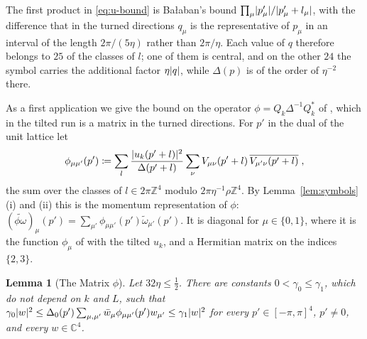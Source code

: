 \documentclass[11pt]{preprint}
\DeclarePairedDelimiter{\abs}{\lvert}{\rvert}
\numberwithin{equation}{section}
\newtheorem{lemma}[theorem]{Lemma}
\theoremstyle{definition}
\theoremstyle{remark}
\theoremstyle{plain}
\begin{document}
The first product in \eqref{eq:u-bound} is Ba{\l}aban's bound $\prod_\mu\abs{p'_\mu}/\abs{p'_\mu + l_\mu}$, with the difference that in the turned directions $q_\mu$ is the representative of $p_\mu$ in an interval of the length $2\pi/(5\eta)$ rather than $2\pi/\eta$. Each value of $q$ therefore belongs to $25$ of the classes of $l$; one of them is central, and on the other $24$ the symbol carries the additional factor $\eta\abs{q}$, while $\Delta(p)$ is of the order of $\eta^{-2}$ there.

As a first application we give the bound on the operator $\phi = Q_k\Delta^{-1}Q_k^*$ of \cite[(1.58), (1.62), pp.~27--28]{BalabanPRT1}, which in the tilted run is a matrix in the turned directions. For $p'$ in the dual of the unit lattice let
\begin{equation}\label{eq:phi-matrix}
    \phi_{\mu\mu'}(p') \coloneqq \sum_l\frac{\abs{u_k(p' + l)}^2}{\Delta(p' + l)}\sum_\nu V_{\mu\nu}(p' + l)\,\overline{V_{\mu'\nu}(p' + l)}\;,
\end{equation}
the sum over the classes of $l \in 2\pi\mathbb Z^4$ modulo $2\pi\eta^{-1}\rho\mathbb Z^4$. By Lemma~\ref{lem:symbols}(i) and (ii) this is the momentum representation of $\phi$: $(\widetilde{\phi\omega})_\mu(p') = \sum_{\mu'}\phi_{\mu\mu'}(p')\tilde\omega_{\mu'}(p')$. It is diagonal for $\mu \in \{ 0, 1 \}$, where it is the function $\phi_\mu$ of \cite[(1.62)]{BalabanPRT1} with the tilted $u_k$, and a Hermitian matrix on the indices $\{ 2, 3 \}$.

\begin{lemma}[The Matrix $\phi$]\label{lem:phi}
Let $32\eta \leq \frac12$. There are constants $0 < \gamma_0 \leq \gamma_1$, which do not depend on $k$ and $L$, such that $\gamma_0\abs{w}^2 \leq \Delta_0(p')\sum_{\mu,\mu'}\bar w_\mu\phi_{\mu\mu'}(p')w_{\mu'} \leq \gamma_1\abs{w}^2$ for every $p' \in [-\pi, \pi]^4$, $p' \neq 0$, and every $w \in \mathbb C^4$.
\end{lemma}
\end{document}
